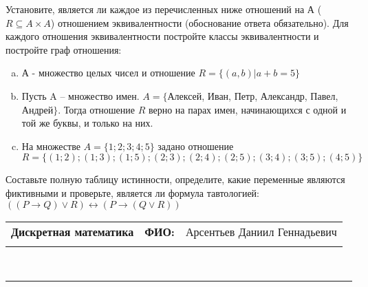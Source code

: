 \documentclass[10pt]{exam}
\newcommand{\class}{Дискретная математика}
\newcommand{\examdate}{}
\begin{document}
\begin{questions}
\question
Установите, является ли каждое из перечисленных ниже отношений на А ($R \subseteq A \times A$) отношением эквивалентности (обоснование ответа обязательно). Для каждого отношения эквивалентности постройте классы 
эквивалентности и постройте граф отношения:
\begin{enumerate} [a)]\setcounter{enumi}{0}
\item А - множество целых чисел и отношение $R = \{(a,b)|a + b = 5\}$
\item Пусть A – множество имен. $A = \{ $Алексей, Иван, Петр, Александр, Павел, Андрей$ \}$. Тогда отношение $R $ верно на парах имен, начинающихся с одной и той же буквы, и только на них.
\item На множестве $A = \{1; 2; 3; 4; 5\}$ задано отношение $R = \{(1; 2); (1; 3); (1; 5); (2; 3); (2; 4); (2; 5); (3; 4); (3; 5); (4; 5)\}$
\end{enumerate}\question Составьте полную таблицу истинности, определите, какие переменные являются фиктивными и проверьте, является ли формула тавтологией:
$((P \rightarrow Q) \lor R) \leftrightarrow (P \rightarrow (Q \lor R))$

\end{questions}
\newpage
\begin{flushright}
\begin{tabular}{p{2.8in} r l}
\textbf{\class} & \textbf{ФИО:} &Арсентьев Даниил Геннадьевич
\\

\textbf{\examdate} &&\\
\end{tabular}\\
\end{flushright}
\rule[1ex]{\textwidth}{.1pt}
\end{document}
